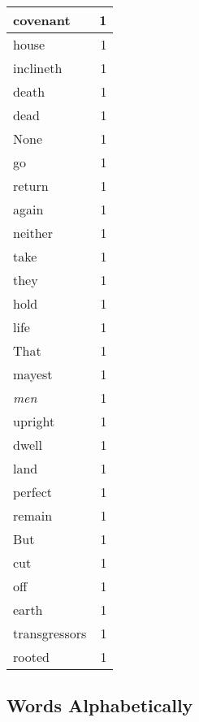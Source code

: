 \begin{center}
\begin{longtable}{l|r}
covenant & 1\\ \hline 
house & 1\\ \hline 
inclineth & 1\\ \hline 
death & 1\\ \hline 
dead & 1\\ \hline 
None & 1\\ \hline 
go & 1\\ \hline 
return & 1\\ \hline 
again & 1\\ \hline 
neither & 1\\ \hline 
take & 1\\ \hline 
they & 1\\ \hline 
hold & 1\\ \hline 
life & 1\\ \hline 
That & 1\\ \hline 
mayest & 1\\ \hline 
\emph{men} & 1\\ \hline 
upright & 1\\ \hline 
dwell & 1\\ \hline 
land & 1\\ \hline 
perfect & 1\\ \hline 
remain & 1\\ \hline 
But & 1\\ \hline 
cut & 1\\ \hline 
off & 1\\ \hline 
earth & 1\\ \hline 
transgressors & 1\\ \hline 
rooted & 1\\ \hline 
\end{longtable}  
\end{center}  


  
\normalsize  

  
  


\subsection{Words Alphabetically}
 
